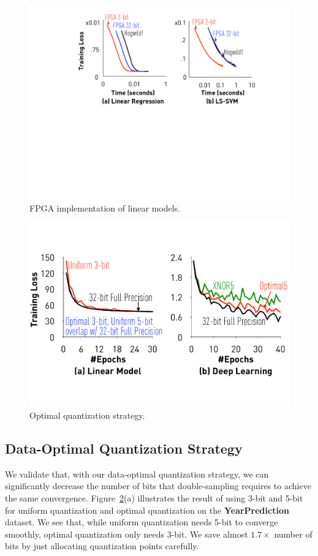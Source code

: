 \documentclass{article}
\begin{document}
\begin{figure}[t]
\centering
\includegraphics[width=0.68\columnwidth]{final-experiments/linear-fpga} 
\vspace{-1em}
\caption{FPGA implementation of linear models.}
\vspace{-1em}
\label{fig:speedup}
\end{figure}

\begin{figure}[t]
\centering
\includegraphics[width=0.68\columnwidth]{final-experiments/optimal} 
\vspace{-1em}
\caption{Optimal quantization strategy.}
\vspace{-2em}
\label{fig:optimal}
\end{figure}

\vspace{-1em}
\subsection{Data-Optimal Quantization Strategy}
\vspace{-0.5em}

We validate that, with our data-optimal quantization strategy, we can 
significantly decrease the number of 
bits that double-sampling requires to 
achieve the same convergence.
Figure~\ref{fig:optimal}(a) illustrates
the result of using 3-bit and 5-bit
for uniform quantization and optimal 
quantization on the {\bf YearPrediction}
dataset. We see that,
while uniform quantization needs 5-bit
to converge smoothly, optimal
quantization only needs 3-bit. 
We save almost $1.7\times$ number of 
bits by just allocating quantization points carefully.
\end{document}
